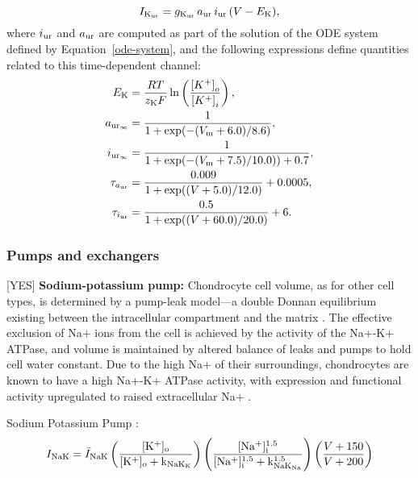 \begin{equation}
    I_{\rm K_{\rm ur}} = g_{\rm K_{\rm ur}}\, a_{\rm ur}\, i_{\rm
      ur}\, (V - E_{\rm K}),
\end{equation}
where $i_{\rm ur}$ and $a_{\rm ur}$ are computed as part of the
solution of the ODE system defined by Equation~\ref{ode-system}, and
the following expressions define quantities related to this
time-dependent channel:
\begin{equation}
  \begin{split}
    E_{\rm K} & =  \frac{R T}{z_{\rm K} F}
    \ln\left(\frac{\left[K^{+}\right]_{o}}
      {\left[K^{+}\right]_{i}}\right),\\
    a_{{\rm ur}_{\infty}} & = \frac{1}{1 + \exp(-(V_{\rm m} +
      6.0)/8.6)},\\
    i_{{\rm ur}_{\infty}} & = \frac{1}{1 + \exp(-(V_{\rm m} +
      7.5)/10.0)) + 0.7},\\
    \tau_{a_{\rm ur}} & = \frac{0.009}{1 + \exp((V + 5.0)/12.0)} +
    0.0005,\\
    \tau_{i_{\rm ur}} & = \frac{0.5}{1 + \exp((V +60.0)/20.0)} +
    6.\\
  \end{split}
\end{equation}

\subsubsection*{Pumps and exchangers}
\label{sec:pumps-and-exchangers}

[YES] {\bf Sodium-potassium pump:} Chondrocyte cell volume, as for
other cell types, is determined by a pump-leak model---a double Donnan
equilibrium existing between the intracellular compartment and the
matrix \citep{Stockwell1991}. The effective exclusion of Na+ ions from
the cell is achieved by the activity of the Na+-K+ ATPase, and volume
is maintained by altered balance of leaks and pumps to hold cell water
constant. Due to the high Na+ of their surroundings, chondrocytes are
known to have a high Na+-K+ ATPase activity, with expression and
functional activity upregulated to raised extracellular Na+
\citep{Mobasherietal1997}.

Sodium Potassium Pump \citep[Table 12, pp. 77]{Nygrenetal1998}:
\begin{equation}
  I_{\rm NaK} =
  \bar{I}_{\rm NaK} \left( \frac{[\rm K^{+}]_{\rm o}}{[\rm K^{+}]_{\rm o} +
    k_{\rm NaK_{K}}} \right) \left(\frac{[\rm Na^{+}]^{1.5}_{\rm i}}{[\rm
    Na^{+}]^{1.5}_{\rm i} + k^{1.5}_{\rm NaK_{Na}}}\right) \left( \frac{V + 150}{V +
    200} \right)
\end{equation}

